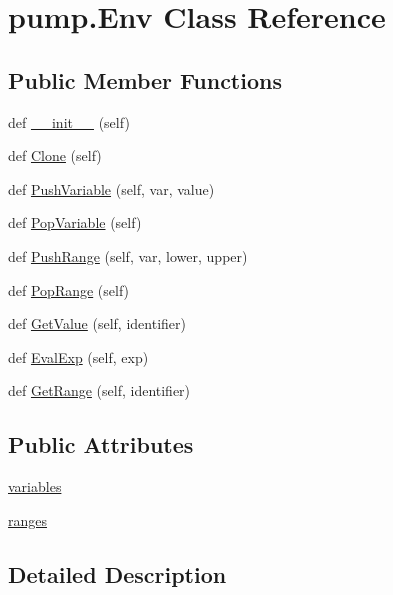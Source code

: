 \hypertarget{classpump_1_1_env}{}\section{pump.\+Env Class Reference}
\label{classpump_1_1_env}
\subsection*{Public Member Functions}
\begin{DoxyCompactItemize}
\item 
def \hyperlink{classpump_1_1_env_a803732618a49ab4a2edf098b78081611}{\+\_\+\+\_\+init\+\_\+\+\_\+} (self)
\item 
def \hyperlink{classpump_1_1_env_a4c1b156cfa4aec708746bbe07dae5f1a}{Clone} (self)
\item 
def \hyperlink{classpump_1_1_env_ae0abc25733c61a8cc010cc5d76dd0dd8}{Push\+Variable} (self, var, value)
\item 
def \hyperlink{classpump_1_1_env_abf35f8b971acedb275bb92bb29fcd587}{Pop\+Variable} (self)
\item 
def \hyperlink{classpump_1_1_env_a600c34cac1e4ba75406efeadb2d7dd95}{Push\+Range} (self, var, lower, upper)
\item 
def \hyperlink{classpump_1_1_env_a45474355fc03b69e7449199cc8012ba9}{Pop\+Range} (self)
\item 
def \hyperlink{classpump_1_1_env_a43c3609179d5e458266731199e35313b}{Get\+Value} (self, identifier)
\item 
def \hyperlink{classpump_1_1_env_a29fa1ceb1f7c22e8e982133f4808317f}{Eval\+Exp} (self, exp)
\item 
def \hyperlink{classpump_1_1_env_a1df05a550bdcfe4bb8c5b1608484a6dc}{Get\+Range} (self, identifier)
\end{DoxyCompactItemize}
\subsection*{Public Attributes}
\begin{DoxyCompactItemize}
\item 
\hyperlink{classpump_1_1_env_aba6456f3d0d23ac92bc9508c1b966bcd}{variables}
\item 
\hyperlink{classpump_1_1_env_a8d5fec087c1a9108de9b105922b34309}{ranges}
\end{DoxyCompactItemize}


\subsection{Detailed Description}


